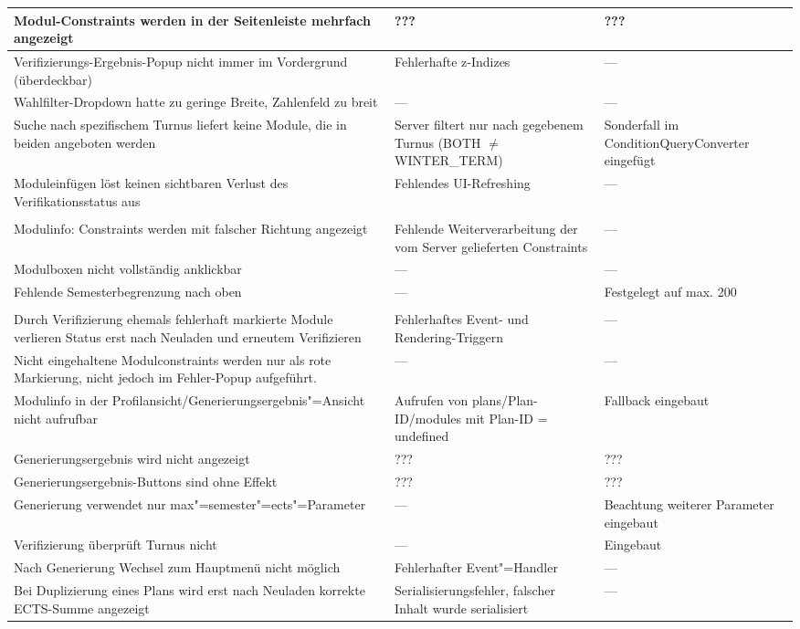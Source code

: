 \begin{longtable}{| >{\hspace{0pt}} p{} | >{\hspace{0pt}} p{} | >{\hspace{0pt}} p{} | }
	\hline
	Modul-Constraints werden in der Seitenleiste mehrfach angezeigt & ??? & ??? \\
	\hline
	Verifizierungs-Ergebnis-Popup nicht immer im Vordergrund (überdeckbar) & Fehlerhafte z-Indizes & --- \\
	\hline
	Wahlfilter-Dropdown hatte zu geringe Breite, Zahlenfeld zu breit & --- & --- \\
	\hline
	Suche nach spezifischem Turnus liefert keine Module, die in beiden angeboten werden & Server filtert nur nach gegebenem Turnus (BOTH $\neq$ WINTER\_TERM) & Sonderfall im ConditionQueryConverter eingefügt \\
	\hline
	Moduleinfügen löst keinen sichtbaren Verlust des Verifikationsstatus aus & Fehlendes UI-Refreshing & --- \\
	\hline
	& & \\
	\hline
	Modulinfo: Constraints werden mit falscher Richtung angezeigt & Fehlende Weiterverarbeitung der vom Server gelieferten Constraints & --- \\
	\hline
	Modulboxen nicht vollständig anklickbar & ---  & --- \\
	\hline
	Fehlende Semesterbegrenzung nach oben & --- & Festgelegt auf max. 200 \\
	\hline
	& & \\
	\hline
	Durch Verifizierung ehemals fehlerhaft markierte Module verlieren Status erst nach Neuladen und erneutem Verifizieren & Fehlerhaftes Event- und Rendering-Triggern & --- \\
	\hline
	Nicht eingehaltene Modulconstraints werden nur als rote Markierung, nicht jedoch im Fehler-Popup aufgeführt. & --- & --- \\
	\hline
	Modulinfo in der Profilansicht/Generierungsergebnis"=Ansicht nicht aufrufbar & Aufrufen von plans/Plan-ID/modules mit Plan-ID = undefined & Fallback eingebaut \\
	\hline
	Generierungsergebnis wird nicht angezeigt & ???  & ??? \\
	\hline
	Generierungsergebnis-Buttons sind ohne Effekt & ???  & ??? \\
	\hline
	Generierung verwendet nur max"=semester"=ects"=Parameter & --- & Beachtung weiterer Parameter eingebaut \\
	\hline
	Verifizierung überprüft Turnus nicht & --- & Eingebaut \\
	\hline
	Nach Generierung Wechsel zum Hauptmenü nicht möglich & Fehlerhafter Event"=Handler & --- \\
	\hline
	Bei Duplizierung eines Plans wird erst nach Neuladen korrekte ECTS-Summe angezeigt & Serialisierungsfehler, falscher Inhalt wurde serialisiert & --- \\

\end{longtable}

